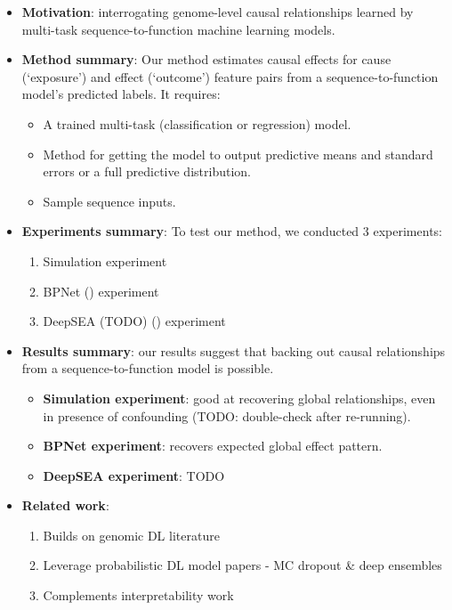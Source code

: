 \documentclass[twoside,11pt]{article}
\begin{document}
\begin{itemize}
	\item \textbf{Motivation}: interrogating genome-level causal relationships learned by multi-task sequence-to-function machine learning models.
	\item \textbf{Method summary}: Our method estimates causal effects for cause (`exposure') and effect (`outcome') feature pairs from a sequence-to-function model's predicted labels. It requires:
		\begin{itemize}
			\item A trained multi-task (classification or regression) model.
			\item Method for getting the model to output predictive means and standard errors or a full predictive distribution.
			\item Sample sequence inputs.
		\end{itemize}
	\item \textbf{Experiments summary}: To test our method, we conducted 3 experiments:
		\begin{enumerate}
			\item Simulation experiment
			\item BPNet (\cite{avsec2020base}) experiment
			\item DeepSEA (TODO) (\cite{zhou2015predicting}) experiment
		\end{enumerate}
	\item \textbf{Results summary}: our results suggest that backing out causal relationships from a sequence-to-function model is possible.
		\begin{itemize}
			\item \textbf{Simulation experiment}: good at recovering global relationships, even in presence of confounding (TODO: double-check after re-running). 
			\item \textbf{BPNet experiment}: recovers expected global effect pattern.
			\item \textbf{DeepSEA experiment}: TODO
		\end{itemize}
	\item \textbf{Related work}: 
	\begin{enumerate}
		\item Builds on genomic DL literature
		\item Leverage probabilistic DL model papers - MC dropout \& deep ensembles
		\item Complements interpretability work
	\end{enumerate} 
\end{itemize}
\end{document}
